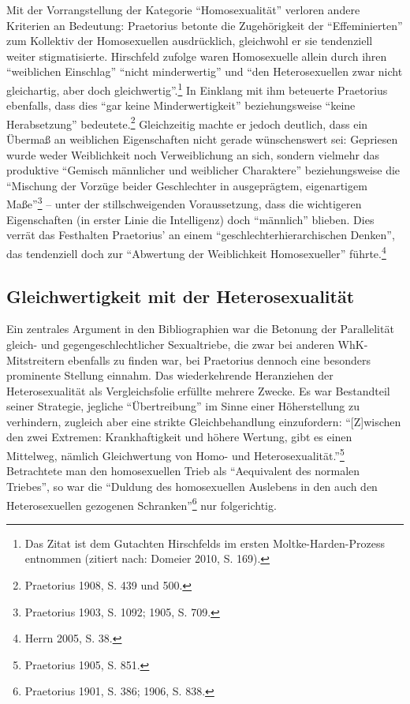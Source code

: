 \documentclass[a4paper,
fontsize=11pt,
oneside,
numbers=noperiodatend,
parskip=half-,
bibliography=totoc,
final
]{scrartcl}
\begin{document}
Mit der Vorrangstellung der Kategorie \enquote{Homosexualität} verloren
andere Kriterien an Bedeutung: Praetorius betonte die Zugehörigkeit der
\enquote{Effeminierten} zum Kollektiv der Homosexuellen ausdrücklich,
gleichwohl er sie tendenziell weiter stigmatisierte. Hirschfeld zufolge
waren Homosexuelle allein durch ihren \enquote{weiblichen Einschlag}
\enquote{nicht minderwertig} und \enquote{den Heterosexuellen zwar nicht
gleichartig, aber doch gleichwertig}.\footnote{Das Zitat ist dem
  Gutachten Hirschfelds im ersten Moltke-Harden-Prozess entnommen
  (zitiert nach: Domeier 2010, S. 169).} In Einklang mit ihm beteuerte
Praetorius ebenfalls, dass dies \enquote{gar keine Minderwertigkeit}
beziehungsweise \enquote{keine Herabsetzung} bedeutete.\footnote{Praetorius
  1908, S. 439 und 500.} Gleichzeitig machte er jedoch deutlich, dass
ein Übermaß an weiblichen Eigenschaften nicht gerade wünschenswert sei:
Gepriesen wurde weder Weiblichkeit noch Verweiblichung an sich, sondern
vielmehr das produktive \enquote{Gemisch männlicher und weiblicher
Charaktere} beziehungsweise die \enquote{Mischung der Vorzüge beider
Geschlechter in ausgeprägtem, eigenartigem Maße}\footnote{Praetorius
  1903, S. 1092; 1905, S. 709.} -- unter der stillschweigenden
Voraussetzung, dass die wichtigeren Eigenschaften (in erster Linie die
Intelligenz) doch \enquote{männlich} blieben. Dies verrät das Festhalten
Praetorius' an einem \enquote{geschlechterhierarchischen Denken}, das
tendenziell doch zur \enquote{Abwertung der Weiblichkeit Homosexueller}
führte.\footnote{Herrn 2005, S. 38.}

\subsection*{Gleichwertigkeit mit der
Heterosexualität}\label{gleichwertigkeit-mit-der-heterosexualituxe4t}

Ein zentrales Argument in den Bibliographien war die Betonung der
Parallelität gleich- und gegengeschlechtlicher Sexualtriebe, die zwar
bei anderen WhK-Mitstreitern ebenfalls zu finden war, bei Praetorius
dennoch eine besonders prominente Stellung einnahm. Das wiederkehrende
Heranziehen der Heterosexualität als Vergleichsfolie erfüllte mehrere
Zwecke. Es war Bestandteil seiner Strategie, jegliche
\enquote{Übertreibung} im Sinne einer Höherstellung zu verhindern,
zugleich aber eine strikte Gleichbehandlung einzufordern:
\enquote{{[}Z{]}wischen den zwei Extremen: Krankhaftigkeit und höhere
Wertung, gibt es einen Mittelweg, nämlich Gleichwertung von Homo- und
Heterosexualität.}\footnote{Praetorius 1905, S. 851.} Betrachtete man
den homosexuellen Trieb als \enquote{Aequivalent des normalen Triebes},
so war die \enquote{Duldung des homosexuellen Auslebens in den auch den
Heterosexuellen gezogenen Schranken}\footnote{Praetorius 1901, S. 386;
  1906, S. 838.} nur folgerichtig.
\end{document}
